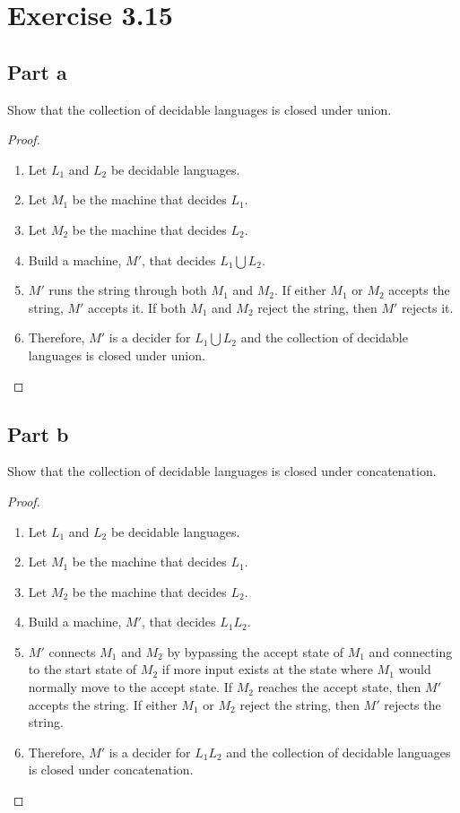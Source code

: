 \documentclass{article}
\newcommand{\union}{\bigcup}
\begin{document}
\section{Exercise 3.15}

\subsection{Part a}

Show that the collection of decidable languages is closed under union.

\begin{proof}
		\mbox{}
		\begin{enumerate}
		  \item Let $L_1$ and $L_2$ be decidable languages.
		  \item Let $M_1$ be the machine that decides $L_1$.
		  \item Let $M_2$ be the machine that decides $L_2$.
		  \item Build a machine, $M'$, that decides $L_1 \union L_2$.
		  \item $M'$ runs the string through both $M_1$ and $M_2$. If either $M_1$ or
		  $M_2$ accepts the string, $M'$ accepts it. If both $M_1$ and $M_2$ reject
		  the string, then $M'$ rejects it.
		  \item Therefore, $M'$ is a decider for $L_1 \union L_2$ and the
		  collection of decidable languages is closed under union. \qedhere
		\end{enumerate}
\end{proof}

\subsection{Part b}

Show that the collection of decidable languages is closed under concatenation.

\begin{proof}
		\mbox{}
		\begin{enumerate}
		  \item Let $L_1$ and $L_2$ be decidable languages.
		  \item Let $M_1$ be the machine that decides $L_1$.
		  \item Let $M_2$ be the machine that decides $L_2$.
		  \item Build a machine, $M'$, that decides $L_1 L_2$.
		  \item $M'$ connects $M_1$ and $M_2$ by bypassing the accept state of $M_1$
		  and connecting to the start state of $M_2$ if more input exists at the state
		  where $M_1$ would normally move to the accept state. If $M_2$ reaches the
		  accept state, then $M'$ accepts the string. If either $M_1$ or $M_2$ reject
		  the string, then $M'$ rejects the string.
		  \item Therefore, $M'$ is a decider for $L_1 L_2$ and the
		  collection of decidable languages is closed under concatenation. \qedhere
		\end{enumerate}
\end{proof}
\end{document}
